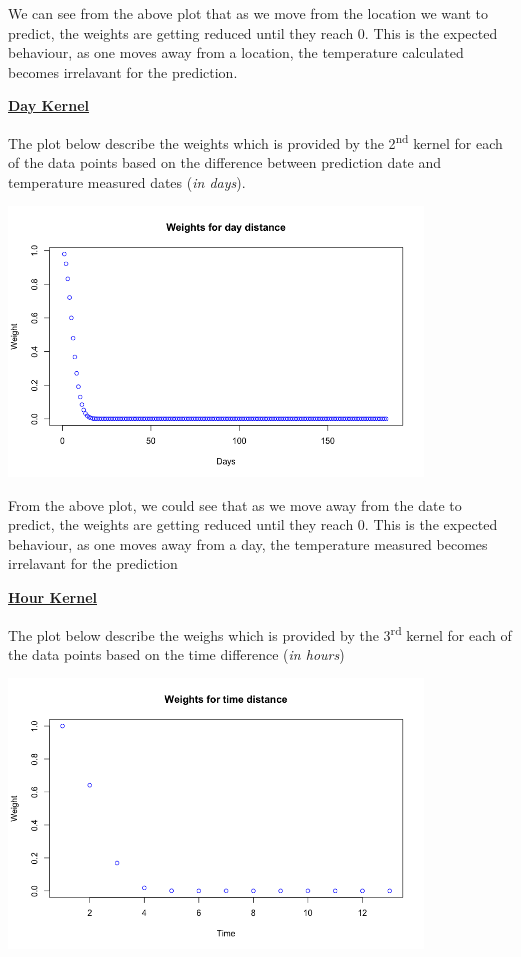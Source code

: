 \documentclass[a4paper,10pt]{article}
\begin{document}
We can see from the above plot that as we move from the location we want to predict, the weights are getting reduced until they reach 0. This is the expected behaviour,
as one moves away from a location, the temperature calculated becomes irrelavant for the prediction. \par
\textbf{\underline{Day Kernel}} \par
The plot below describe the weights which is provided by the 2\textsuperscript{nd} kernel for each of the data points based on the difference between prediction date and
temperature measured dates (\textit{in days}).
\begin{center}
  \includegraphics[width=110mm,scale=0.10]{Weights_Day_1.png}
\end{center} 
From the above plot, we could see that as we move away from the date to predict, the weights are getting reduced until they reach 0. This is the expected behaviour,
as one moves away from a day, the temperature measured becomes irrelavant for the prediction\par
\textbf{\underline{Hour Kernel}} \par
The plot below describe the weighs which is provided by the 3\textsuperscript{rd} kernel for each of the data points based on the time difference (\textit{in hours})
\begin{center}
  \includegraphics[width=110mm,scale=0.10]{Weights_hour_1.png}
\end{center}
\end{document}
